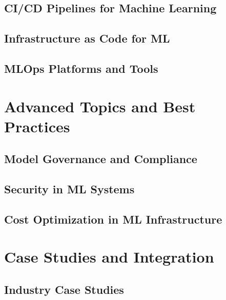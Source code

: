 \documentclass[12pt,a4paper]{book}
\theoremstyle{definition}
\theoremstyle{plain}
\theoremstyle{remark}
\begin{document}
\chapter{CI/CD Pipelines for Machine Learning}
\label{ch:cicd}


\chapter{Infrastructure as Code for ML}
\label{ch:infrastructure}


\chapter{MLOps Platforms and Tools}
\label{ch:mlops_platforms}


\part{Advanced Topics and Best Practices}

\chapter{Model Governance and Compliance}
\label{ch:governance}


\chapter{Security in ML Systems}
\label{ch:security}


\chapter{Cost Optimization in ML Infrastructure}
\label{ch:cost_optimization}


\part{Case Studies and Integration}

\chapter{Industry Case Studies}
\label{ch:case_studies}

\end{document}
